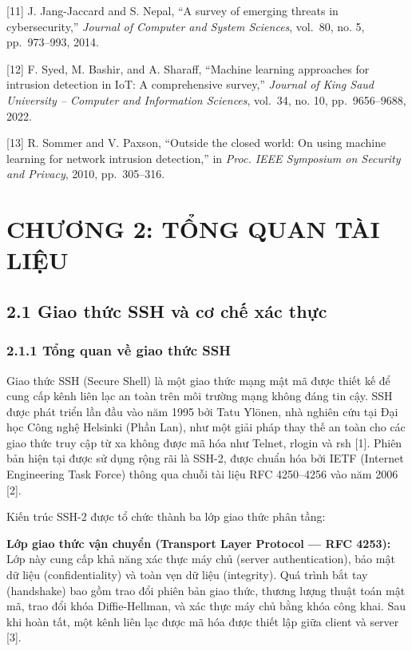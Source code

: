 \documentclass[
  a4paper]{report}
\begin{document}
{[}11{]} J. Jang-Jaccard and S. Nepal, ``A survey of emerging threats in
cybersecurity,'' \emph{Journal of Computer and System Sciences},
vol.~80, no. 5, pp.~973--993, 2014.

{[}12{]} F. Syed, M. Bashir, and A. Sharaff, ``Machine learning
approaches for intrusion detection in IoT: A comprehensive survey,''
\emph{Journal of King Saud University -- Computer and Information
Sciences}, vol.~34, no. 10, pp.~9656--9688, 2022.

{[}13{]} R. Sommer and V. Paxson, ``Outside the closed world: On using
machine learning for network intrusion detection,'' in \emph{Proc. IEEE
Symposium on Security and Privacy}, 2010, pp.~305--316.

\chapter{CHƯƠNG 2: TỔNG QUAN TÀI
LIỆU}\label{chux1b0ux1a1ng-2-tux1ed5ng-quan-tuxe0i-liux1ec7u}

\section{2.1 Giao thức SSH và cơ chế xác
thực}\label{giao-thux1ee9c-ssh-vuxe0-cux1a1-chux1ebf-xuxe1c-thux1ef1c}

\subsection{2.1.1 Tổng quan về giao thức
SSH}\label{tux1ed5ng-quan-vux1ec1-giao-thux1ee9c-ssh}

Giao thức SSH (Secure Shell) là một giao thức mạng mật mã được thiết kế
để cung cấp kênh liên lạc an toàn trên môi trường mạng không đáng tin
cậy. SSH được phát triển lần đầu vào năm 1995 bởi Tatu Ylönen, nhà
nghiên cứu tại Đại học Công nghệ Helsinki (Phần Lan), như một giải pháp
thay thế an toàn cho các giao thức truy cập từ xa không được mã hóa như
Telnet, rlogin và rsh {[}1{]}. Phiên bản hiện tại được sử dụng rộng rãi
là SSH-2, được chuẩn hóa bởi IETF (Internet Engineering Task Force)
thông qua chuỗi tài liệu RFC 4250--4256 vào năm 2006 {[}2{]}.

Kiến trúc SSH-2 được tổ chức thành ba lớp giao thức phân tầng:

\textbf{Lớp giao thức vận chuyển (Transport Layer Protocol --- RFC
4253):} Lớp này cung cấp khả năng xác thực máy chủ (server
authentication), bảo mật dữ liệu (confidentiality) và toàn vẹn dữ liệu
(integrity). Quá trình bắt tay (handshake) bao gồm trao đổi phiên bản
giao thức, thương lượng thuật toán mật mã, trao đổi khóa Diffie-Hellman,
và xác thực máy chủ bằng khóa công khai. Sau khi hoàn tất, một kênh liên
lạc được mã hóa được thiết lập giữa client và server {[}3{]}.
\end{document}
